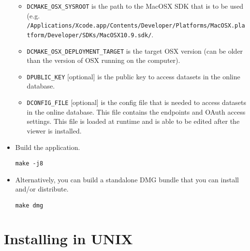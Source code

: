 \documentclass[10pt,a4paper,titlepage]{book}
\begin{document}
\begin{appendices}
\begin{itemize}[itemsep=10pt]
\begin{itemize}
\item[] \texttt{DCMAKE\_OSX\_SYSROOT} is the path to the MacOSX SDK that is to be used (e.g. \texttt{/Applications/Xcode.app/Contents/Developer/Platforms/MacOSX.platform/Developer/SDKs/MacOSX10.9.sdk/}.
\item[] \texttt{DCMAKE\_OSX\_DEPLOYMENT\_TARGET} is the target OSX version (can be older than the version of OSX running on the computer).
\item[] \texttt{DPUBLIC\_KEY} [optional] is the public key to access datasets in the online database.
\item[] \texttt{DCONFIG\_FILE} [optional] is the config file that is needed to access datasets in the online database. This file contains the endpoints and OAuth access settings. This file is loaded at runtime and is able to be edited after the viewer is installed.
\end{itemize}
\item Build the application.
\begin{verbatim}
make -j8
\end{verbatim}
\item Alternatively, you can build a standalone DMG bundle that you can install and/or distribute.
\begin{verbatim}
make dmg
\end{verbatim}
\end{itemize}

\pagebreak
\section*{Installing in UNIX}


\end{appendices}
\end{document}
